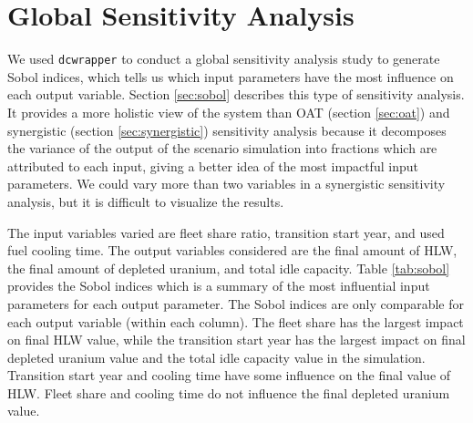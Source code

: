 \section{Global Sensitivity Analysis}
We used \texttt{dcwrapper} to conduct a global sensitivity 
analysis study to generate Sobol indices, which tells us which 
input parameters have the most influence on each output variable.
Section \ref{sec:sobol} describes this type of sensitivity 
analysis.
It provides a more holistic view of the system 
than OAT (section \ref{sec:oat}) and 
synergistic (section \ref{sec:synergistic}) sensitivity 
analysis because it decomposes the variance of the 
output of the scenario simulation into fractions which are 
attributed to each input, giving a better idea of the
most impactful input parameters. 
We could vary more than two variables in a synergistic 
sensitivity analysis, but it is difficult to visualize the results.

The input variables varied are fleet share ratio, 
transition start year, and used fuel cooling time.
The output variables considered are the final amount of HLW, 
the final amount of depleted uranium, and total idle capacity. 
Table \ref{tab:sobol} provides the Sobol indices which is 
a summary of the most influential input parameters 
for each output parameter. 
The Sobol indices are only comparable for each output variable 
(within each column). 
The fleet share has the largest impact on 
final HLW value, while the transition start year has the largest 
impact on final depleted uranium value and the total idle 
capacity value in the simulation. 
Transition start year and cooling time have some influence on 
the final value of HLW. 
Fleet share and cooling time do not influence the final 
depleted uranium value. 
    
